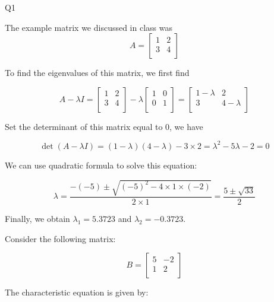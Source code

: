\question Q1\droppoints

\begin{solution}
     The example matrix we discussed in class was
    \[
        A =
        \begin{bmatrix}
            1 & 2 \\
            3 & 4 \\
        \end{bmatrix}
    \]

    To find the eigenvalues of this matrix, we first find

    \[
        A - \lambda I =
        \begin{bmatrix}
            1 & 2 \\
            3 & 4 \\
        \end{bmatrix}
        -
        \lambda
        \begin{bmatrix}
            1 & 0 \\
            0 & 1 \\
        \end{bmatrix}
        =
        \begin{bmatrix}
            1 - \lambda & 2           \\
            3           & 4 - \lambda \\
        \end{bmatrix}
    \]

    Set the determinant of this matrix equal to $0$, we have

    \[
        \det(A - \lambda I)
        = (1 - \lambda)(4 - \lambda) - 3 \times 2
        = \lambda^2 - 5\lambda - 2
        = 0
    \]

    We can use quadratic formula to solve this equation:

    \[
        \lambda
        = \frac{-(-5) \pm \sqrt{(-5)^2 - 4 \times 1 \times (-2)}}{2 \times 1}
        = \frac{5 \pm \sqrt{33}}{2}
    \]

    Finally, we obtain $\lambda_1 = 5.3723$ and $\lambda_2 = -0.3723$.

     Consider the following matrix:

    \[
        B =
        \begin{bmatrix}
            5 & -2 \\
            1 & 2  \\
        \end{bmatrix}
    \]

    The characteristic equation is given by:


\end{solution}
